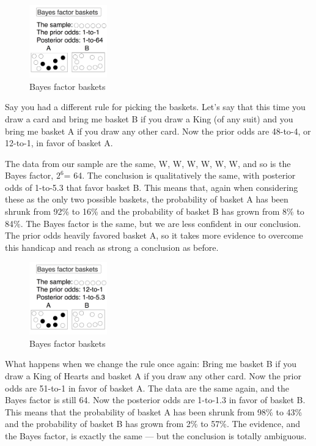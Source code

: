 \begin{figure}[h]
\centering
\includegraphics[width=0.3\textwidth]{pic/p05c03-snip20.png}
\caption{Bayes factor baskets}
\label{fig:p05c03-snip20}
\end{figure}


Say you had a different rule for picking the baskets. Let's say that this time you draw a card and bring me basket B if you draw a King (of any suit) and you bring me basket A if you draw any other card. Now the prior odds are 48-to-4, or 12-to-1, in favor of basket A.

The data from our sample are the same, {W, W, W, W, W, W}, and so is the Bayes factor, $2^6$= 64. The conclusion is qualitatively the same, with posterior odds of 1-to-5.3 that favor basket B. This means that, again when considering these as the only two possible baskets, the probability of basket A has been shrunk from 92\% to 16\% and the probability of basket B has grown from 8\% to 84\%. The Bayes factor is the same, but we are less confident in our conclusion. The prior odds heavily favored basket A, so it takes more evidence to overcome this handicap and reach as strong a conclusion as before.

\begin{figure}[h]
\centering
\includegraphics[width=0.3\textwidth]{pic/p05c03-snip21.png}
\caption{Bayes factor baskets}
\label{fig:p05c03-snip21}
\end{figure}


What happens when we change the rule once again: Bring me basket B if you draw a King of Hearts and basket A if you draw any other card. Now the prior odds are 51-to-1 in favor of basket A. The data are the same again, and the Bayes factor is still 64. Now the posterior odds are 1-to-1.3 in favor of basket B. This means that the probability of basket A has been shrunk from 98\% to 43\% and the probability of basket B has grown from 2\% to 57\%. The evidence, and the Bayes factor, is exactly the same — but the conclusion is totally ambiguous. 


